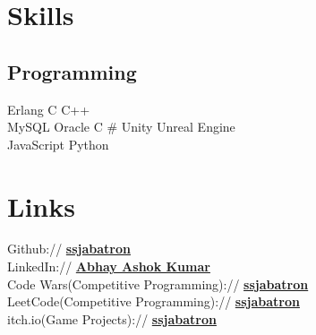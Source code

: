 \documentclass[]{deedy-resume-openfont}
\begin{document}
%
%
\lastupdated

%
%

%
%

\begin{minipage}[t]{0.33\textwidth} 


\section{Skills}
\subsection{Programming}
Erlang \textbullet{}   C \textbullet{} C++\\ 
MySQL \textbullet{} Oracle \textbullet{} C \# \textbullet{} Unity \textbullet{} Unreal Engine \\
 \textbullet{} JavaScript \textbullet{} Python
\sectionsep



\section{Links} 
Github:// \href{https://github.com/SSJAbatron}{\bf ssjabatron} \\
LinkedIn://  \href{https://www.linkedin.com/in/abhay-ashok-kumar-7b685bb3}{\bf Abhay Ashok Kumar} \\
Code Wars(Competitive Programming)://  \href{https://www.codewars.com/users/SSJAbatron}{\bf ssjabatron} \\
LeetCode(Competitive Programming)://  \href{https://leetcode.com/SSJAbatron/}{\bf ssjabatron} \\
itch.io(Game Projects)://  \href{https://ssjabatron.itch.io}{\bf ssjabatron}



\end{minipage}
\end{document}
